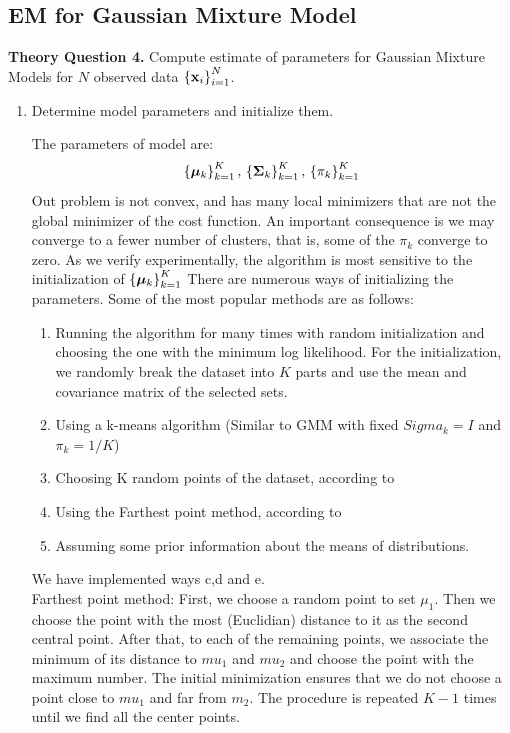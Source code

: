 \documentclass[11pt,a4paper]{article}
\begin{document}
	\subsection{EM for Gaussian Mixture Model}
	\color{blue}
	\large{\textbf{Theory Question 4.}} Compute estimate of parameters for Gaussian Mixture Models for $N$ observed data $\left\{\vb{x}_i\right\}_{i=1}^{N}$.
	\begin{enumerate}
		\item Determine model parameters and initialize them.
		\color{black}
		
		The parameters of model are:
		\[
		\left\{\vb*{\mu}_{k}\right\}_{k=1}^{K},\, \left\{\vb{\Sigma}_{k}\right\}_{k=1}^{K},\, 
		\left\{\pi_{k}\right\}_{k=1}^{K}
		\]
		Out problem is not convex, and has many local minimizers that are not the global minimizer of the cost function. An important consequence is we may converge to a fewer number of clusters, that is, some of the $\pi_k$ converge to zero. As we verify experimentally, the algorithm is most sensitive to the initialization of $\left\{\vb*{\mu}_{k}\right\}_{k=1}^{K}$ There are numerous ways of initializing the parameters. Some of the most popular methods are as follows:
		\begin{enumerate}
		\item Running the algorithm for many times with random initialization and choosing the one with the minimum log likelihood. For the initialization, we randomly break the dataset into $K$ parts and use the mean and covariance matrix of the selected sets.
		\item Using a k-means algorithm (Similar to GMM with fixed $Sigma_k=I$ and $\pi_k=1/K$)
		\item Choosing K random points of the dataset, according to  \cite{Murphy}
		\item Using the Farthest point method, according to \cite{Murphy} 
		\item Assuming some prior information about the means of distributions.
		\end{enumerate}
		We have implemented ways c,d and e.\\
		Farthest point method: First, we choose a random point to set $\mu_1$. Then we choose the point with the most (Euclidian) distance to it as the second central point. After that, to each of the remaining points, we associate the minimum of its distance to $mu_1$ and $mu_2$ and choose the point with the maximum number. The initial minimization ensures that we do not choose a point close to $mu_1$ and far from $m_2$. The procedure is repeated $K-1$ times until we find all the center points.

\end{enumerate}
\end{document}
